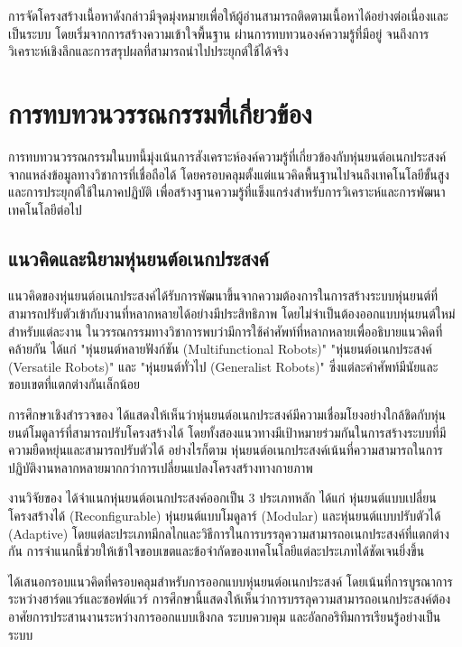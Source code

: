 \documentclass[a4paper]{article}
\begin{document}
การจัดโครงสร้างเนื้อหาดังกล่าวมีจุดมุ่งหมายเพื่อให้ผู้อ่านสามารถติดตามเนื้อหาได้อย่างต่อเนื่องและเป็นระบบ โดยเริ่มจากการสร้างความเข้าใจพื้นฐาน ผ่านการทบทวนองค์ความรู้ที่มีอยู่ จนถึงการวิเคราะห์เชิงลึกและการสรุปผลที่สามารถนำไปประยุกต์ใช้ได้จริง

\section{การทบทวนวรรณกรรมที่เกี่ยวข้อง}
การทบทวนวรรณกรรมในบทนี้มุ่งเน้นการสังเคราะห์องค์ความรู้ที่เกี่ยวข้องกับหุ่นยนต์อเนกประสงค์จากแหล่งข้อมูลทางวิชาการที่เชื่อถือได้ โดยครอบคลุมตั้งแต่แนวคิดพื้นฐานไปจนถึงเทคโนโลยีขั้นสูงและการประยุกต์ใช้ในภาคปฏิบัติ เพื่อสร้างฐานความรู้ที่แข็งแกร่งสำหรับการวิเคราะห์และการพัฒนาเทคโนโลยีต่อไป

\subsection{แนวคิดและนิยามหุ่นยนต์อเนกประสงค์}

แนวคิดของหุ่นยนต์อเนกประสงค์ได้รับการพัฒนาขึ้นจากความต้องการในการสร้างระบบหุ่นยนต์ที่สามารถปรับตัวเข้ากับงานที่หลากหลายได้อย่างมีประสิทธิภาพ โดยไม่จำเป็นต้องออกแบบหุ่นยนต์ใหม่สำหรับแต่ละงาน \parencite{liang2025decoding} ในวรรณกรรมทางวิชาการพบว่ามีการใช้คำศัพท์ที่หลากหลายเพื่ออธิบายแนวคิดที่คล้ายกัน ได้แก่ "หุ่นยนต์หลายฟังก์ชัน (Multifunctional Robots)" "หุ่นยนต์อเนกประสงค์ (Versatile Robots)" และ "หุ่นยนต์ทั่วไป (Generalist Robots)" ซึ่งแต่ละคำศัพท์มีนัยและขอบเขตที่แตกต่างกันเล็กน้อย

การศึกษาเชิงสำรวจของ \textcite{bi2016survey} ได้แสดงให้เห็นว่าหุ่นยนต์อเนกประสงค์มีความเชื่อมโยงอย่างใกล้ชิดกับหุ่นยนต์โมดูลาร์ที่สามารถปรับโครงสร้างได้ โดยทั้งสองแนวทางมีเป้าหมายร่วมกันในการสร้างระบบที่มีความยืดหยุ่นและสามารถปรับตัวได้ อย่างไรก็ตาม หุ่นยนต์อเนกประสงค์เน้นที่ความสามารถในการปฏิบัติงานหลากหลายมากกว่าการเปลี่ยนแปลงโครงสร้างทางกายภาพ

งานวิจัยของ \textcite{hameed2017modular} ได้จำแนกหุ่นยนต์อเนกประสงค์ออกเป็น 3 ประเภทหลัก ได้แก่ หุ่นยนต์แบบเปลี่ยนโครงสร้างได้ (Reconfigurable) หุ่นยนต์แบบโมดูลาร์ (Modular) และหุ่นยนต์แบบปรับตัวได้ (Adaptive) โดยแต่ละประเภทมีกลไกและวิธีการในการบรรลุความสามารถอเนกประสงค์ที่แตกต่างกัน การจำแนกนี้ช่วยให้เข้าใจขอบเขตและข้อจำกัดของเทคโนโลยีแต่ละประเภทได้ชัดเจนยิ่งขึ้น

\textcite{seo2019modular} ได้เสนอกรอบแนวคิดที่ครอบคลุมสำหรับการออกแบบหุ่นยนต์อเนกประสงค์ โดยเน้นที่การบูรณาการระหว่างฮาร์ดแวร์และซอฟต์แวร์ การศึกษานี้แสดงให้เห็นว่าการบรรลุความสามารถอเนกประสงค์ต้องอาศัยการประสานงานระหว่างการออกแบบเชิงกล ระบบควบคุม และอัลกอริทึมการเรียนรู้อย่างเป็นระบบ
\end{document}
